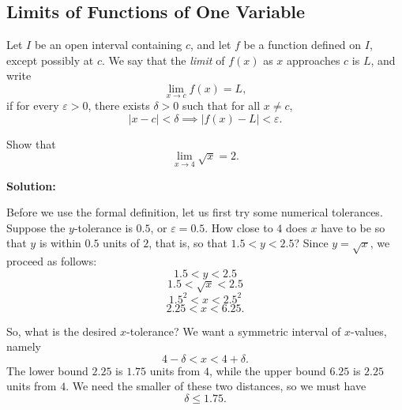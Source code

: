\subsection{Limits of Functions of One Variable}
\begin{definition}
Let $I$ be an open interval containing $c$, and let $f$ be a function defined on $I$, except possibly at $c$. We say that the \emph{limit} of $f(x)$ as $x$ approaches $c$ is $L$, and write
\[
\lim_{x\to c} f(x)=L,
\]
if for every $\varepsilon>0$, there exists $\delta>0$ such that for all $x\neq c$, 
\[
|x-c|<\delta \implies |f(x)-L|<\varepsilon.
\]
\end{definition}
\begin{example}
Show that
\[
\lim_{x\to 4}\sqrt{x}=2.
\]

\bigskip
\noindent\textbf{Solution:}

Before we use the formal definition, let us first try some numerical tolerances.
Suppose the $y$-tolerance is $0.5$, or $\varepsilon=0.5$.
How close to $4$ does $x$ have to be so that $y$ is within $0.5$ units of $2$,
that is, so that $1.5<y<2.5$?
Since $y=\sqrt{x}$, we proceed as follows:
\[
1.5<y<2.5
\]
\[
1.5<\sqrt{x}<2.5
\]
\[
1.5^2<x<2.5^2
\]
\[
2.25<x<6.25.
\]

So, what is the desired $x$-tolerance?
We want a symmetric interval of $x$-values, namely
\[
4-\delta < x < 4+\delta.
\]
The lower bound $2.25$ is $1.75$ units from $4$, while the upper bound $6.25$ is
$2.25$ units from $4$.
We need the smaller of these two distances, so we must have
\[
\delta \le 1.75.
\]

\bigskip

\begin{center}
\end{center}
\end{example}
